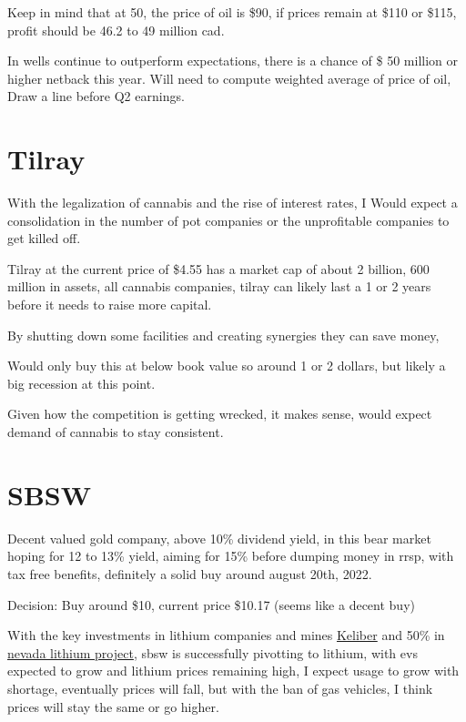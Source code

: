 Keep in mind that at 50, the price of oil is \$90, if prices remain at \$110 or \$115, profit should be 46.2 to 49 million cad.

In wells continue to outperform expectations, there is a chance of \$ 50 million or higher netback this year. Will need to compute weighted average of price of oil, Draw a line before Q2 earnings.


\section{Tilray}

With the legalization of cannabis and the rise of interest rates, I Would expect a consolidation in the number of pot companies or the unprofitable companies to get killed off.

Tilray at the current price of \$4.55 has a market cap of about 2 billion, 600 million in assets, all cannabis companies, tilray can likely last a 1 or 2 years before it needs to raise more capital.

By shutting down some facilities and creating synergies they can save money,

Would only buy this at below book value so around 1 or 2 dollars, but likely a big recession at this point.

Given how the competition is getting wrecked, it makes sense, would expect demand of cannabis to stay consistent.


\section{SBSW}

Decent valued gold company, above 10\% dividend yield, in this bear market hoping for 12 to 13\% yield, aiming for 15\% before dumping money in rrsp, with tax free benefits, definitely a solid buy around august 20th, 2022.

Decision: Buy around \$10, current price \$10.17 (seems like a decent buy)

With the key investments in lithium companies and mines \href{https://www.kitco.com/news/2022-06-30/Sibanye-Stillwater-to-achieve-majority-shareholding-in-lithium-developer-Keliber.html}{Keliber} and 50\% in \href{https://www.mining.com/sibanye-stillwater-grabs-50-of-nevada-lithium-project-for-490m/}{nevada lithium project}, sbsw is successfully pivotting to lithium, with evs expected to grow and lithium prices remaining high, I expect usage to grow with shortage, eventually prices will fall, but with the ban of gas vehicles, I think prices will stay the same or go higher.


